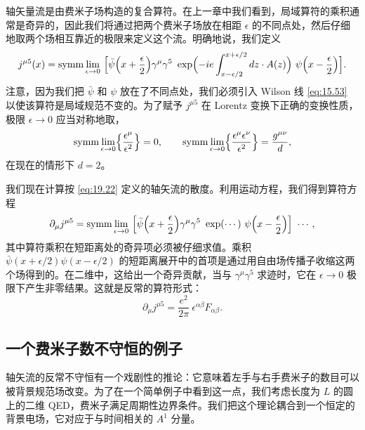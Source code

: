 轴矢量流是由费米子场构造的复合算符。在上一章中我们看到，局域算符的乘积通常是奇异的，因此我们将通过把两个费米子场放在相距 $\epsilon$ 的不同点处，然后仔细地取两个场相互靠近的极限来定义这个流。明确地说，我们定义
\begin{equation}
  j^{\mu 5}(x) = \mathrm{symm}\lim_{\epsilon\to 0}\ \Bigl[
    \bar{\psi}\Bigl( x + \frac{\epsilon}{2} \Bigr)\gamma^\mu\gamma^5\
    \exp\Bigl( -ie\int_{x-\epsilon/2}^{x+\epsilon/2} dz\cdot A(z) \Bigr)\
    \psi\Bigl( x - \frac{\epsilon}{2} \Bigr) \Bigr] .
  \label{eq:19.22}
\end{equation}
注意，因为我们把 $\bar{\psi}$ 和 $\psi$ 放在了不同点处，我们必须引入 Wilson 线 \eqref{eq:15.53} 以使该算符是局域规范不变的。为了赋予 $j^{\mu 5}$ 在 Lorentz 变换下正确的变换性质，极限 $\epsilon\to 0$ 应当对称地取，
\begin{equation}
  \mathrm{symm}\lim_{\epsilon\to 0}\Bigl\{ \frac{\epsilon^\mu}{\epsilon^2}
    \Bigr\} = 0,\qquad
  \mathrm{symm}\lim_{\epsilon\to 0}\Bigl\{ \frac{\epsilon^\mu\epsilon^\nu}
    {\epsilon^2} \Bigr\} = \frac{g^{\mu\nu}}{d} ,
  \label{eq:19.23}
\end{equation}
在现在的情形下 $d = 2$。

我们现在计算按 \eqref{eq:19.22} 定义的轴矢流的散度。利用运动方程，我们得到算符方程
\begin{equation}
  \partial_\mu j^{\mu 5} = \mathrm{symm}\lim_{\epsilon\to 0}\ \Bigl[
    \bar{\psi}\Bigl( x + \frac{\epsilon}{2} \Bigr)\gamma^\mu\gamma^5\
    \exp(\cdots)\ \psi\Bigl( x - \frac{\epsilon}{2} \Bigr) \Bigr]\
    \cdots ,
  \label{eq:19.25}
\end{equation}
其中算符乘积在短距离处的奇异项必须被仔细求值。乘积 $\bar{\psi}(x+\epsilon/2)\psi(x-\epsilon/2)$ 的短距离展开中的首项是通过用自由场传播子收缩这两个场得到的。在二维中，这给出一个奇异贡献，当与 $\gamma^\mu\gamma^5$ 求迹时，它在 $\epsilon\to 0$ 极限下产生非零结果。这就是反常的算符形式：
\begin{equation}
  \partial_\mu j^{\mu 5} = \frac{e^2}{2\pi}\ \epsilon^{\alpha\beta}F_{\alpha\beta}
  .
  \label{eq:19.29}
\end{equation}

\subsection{一个费米子数不守恒的例子}

轴矢流的反常不守恒有一个戏剧性的推论：它意味着左手与右手费米子的数目可以被背景规范场改变。为了在一个简单例子中看到这一点，我们考虑长度为 $L$ 的圆上的二维 QED，费米子满足周期性边界条件。我们把这个理论耦合到一个恒定的背景电场，它对应于与时间相关的 $A^1$ 分量。

